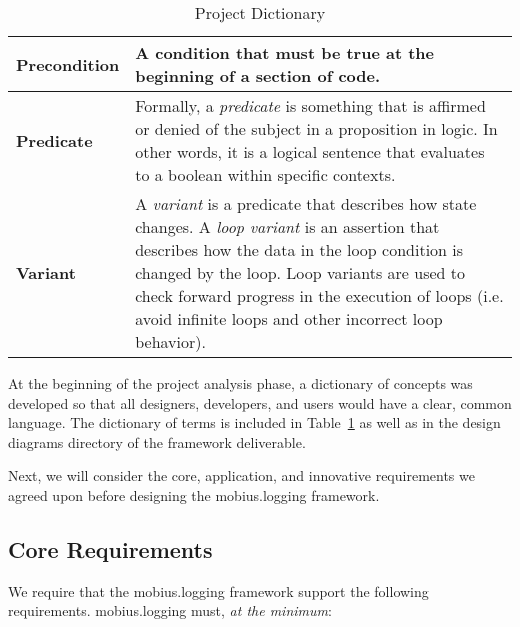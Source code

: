 \documentclass{article}
\begin{document}
\begin{table}[htbp]
\begin{center}
\begin{tabular}{|l|p{4in}|}
        \textbf{Precondition} & 
        A condition that must be true at the beginning of a
        section of code. \\ \hline 

        \textbf{Predicate} & 
        Formally, a \emph{predicate} is something that is
        affirmed or denied of the subject in a proposition in
        logic. In other words, it is a logical sentence that
        evaluates to a boolean within specific contexts. \\ \hline

        \textbf{Variant} & 
        A \emph{variant} is a predicate that describes how
        state changes. A \emph{loop variant} is an assertion
        that describes how the data in the loop condition is
        changed by the loop.  Loop variants are used to
        check forward progress in the execution of loops (i.e.
        avoid infinite loops and other incorrect loop behavior). \\ \hline
    \end{tabular}
    \caption{Project Dictionary}
    \label{tab:dictionary}
  \end{center}
\end{table}

At the beginning of the project analysis phase, a dictionary of
concepts was developed so that all designers, developers, and users
would have a clear, common language.  The dictionary of terms is
included in Table~\ref{tab:dictionary} as well as in the design
diagrams directory of the framework deliverable.

Next, we will consider the core, application, and innovative
requirements we agreed upon before designing the mobius.logging framework.

\subsection{Core Requirements}
\label{sec:core}

We require that the mobius.logging framework support the following
requirements.  mobius.logging must, \emph{at the minimum}:
\end{document}

